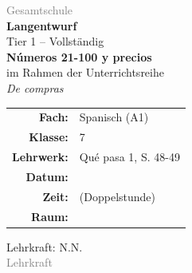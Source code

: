 \documentclass[11pt,a4paper]{article}
\newcommand{\fach}{Spanisch}
\newcommand{\jahrgangsstufe}{7}
\newcommand{\schulart}{Gesamtschule}
\newcommand{\stundenthema}{Números 21-100 y precios}
\newcommand{\reihenthema}{De compras}
\newcommand{\lehrkraft}{N.N.}
\newcommand{\ausbildungsstand}{Lehrkraft}
\newcommand{\gerniveau}{A1}
\newcommand{\lehrwerk}{Qué pasa 1}
\newcommand{\lehrwerkseite}{S. 48-49}
\begin{document}
\begin{titlepage}
    \centering
    \vspace*{2cm}

    {\large\textcolor{gray}{\schulart}}\\[2cm]

    {\Huge\textcolor{fach}{\textbf{Langentwurf}}}\\[0.5cm]
    {\large Tier 1 -- Vollständig}\\[2cm]

    {\LARGE\textbf{\stundenthema}}\\[0.5cm]
    {\large im Rahmen der Unterrichtsreihe}\\[0.3cm]
    {\Large\textit{\reihenthema}}\\[2cm]

    \begin{tabular}{rl}
        \textbf{Fach:} & \fach{} (\gerniveau) \\[0.3cm]
        \textbf{Klasse:} & \jahrgangsstufe \\[0.3cm]
        \textbf{Lehrwerk:} & \lehrwerk, \lehrwerkseite \\[0.3cm]
        \textbf{Datum:} & \underline{\hspace{3cm}} \\[0.3cm]
        \textbf{Zeit:} & \underline{\hspace{3cm}} (Doppelstunde) \\[0.3cm]
        \textbf{Raum:} & \underline{\hspace{3cm}} \\[0.3cm]
    \end{tabular}

    \vfill

    {\large Lehrkraft: \lehrkraft}\\[0.3cm]
    {\normalsize\textcolor{gray}{\ausbildungsstand}}\\[1cm]

\end{titlepage}

\tableofcontents
\newpage

\end{document}
